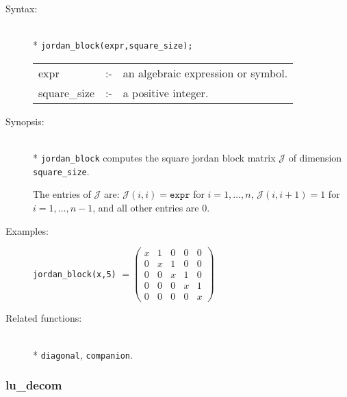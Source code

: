 \begin{description}
\item[Syntax:]\mbox{}\\*
\texttt{jordan\_block(expr,square\_size);}\\[2mm]
\begin{tabular}{l l l}
expr        &:-& an algebraic expression or symbol. \\
square\_size &:-& a positive integer.
\end{tabular}

\item[Synopsis:]\mbox{}\\*
\texttt{jordan\_block} computes the square jordan block matrix $\mathcal{J}$
                of dimension \texttt{square\_size}.

The entries of $\mathcal{J}$ are: $\mathcal{J}(i,i) = \texttt{expr}$ for
                $i=1,\ldots,n$, $\mathcal{J}(i,i+1) = 1$ for $i=1,\ldots,n-1$,
                and all other entries are 0.

\item[Examples:]\nopagebreak
\begin{flushleft}
\texttt{jordan\_block(x,5)} \(=
 \begin{pmatrix} x & 1 & 0 & 0 & 0 \\ 0 & x & 1 & 0 & 0 \\ 0
& 0 & x & 1 & 0 \\ 0 & 0 & 0 & x & 1 \\ 0 & 0 & 0 & 0 & x
 \end{pmatrix}\)
\end{flushleft}

\item[Related functions:]\mbox{}\\*
\texttt{diagonal}, \texttt{companion}.
\end{description}


\subsubsection{lu\_decom}
\label{linalg:lu_decom}
\hypertarget{operator:LU_DECOM}{}

